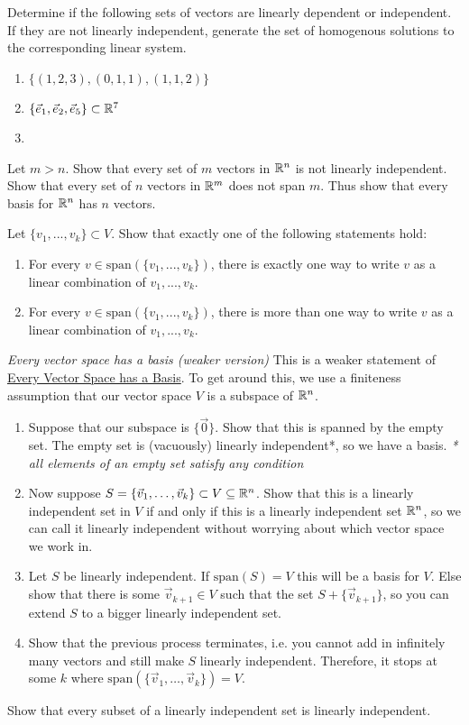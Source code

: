 \begin{exerciselist}
	\item Determine if the following sets of vectors are linearly dependent or independent. If they are not linearly independent, generate the set of homogenous solutions to the corresponding linear system. \begin{enumerate}[label=(\alph*)]
		\item $\{(1,2,3), (0,1,1),(1,1,2)\}$
		\item $\{\vec{e}_1,\vec{e}_2,\vec{e}_5\}\subset\mathbb{R}^7$
		\item 
	\end{enumerate}
	\item Let $m>n$. Show that every set of $m$ vectors in $\mathbb{R}^n$ is not linearly independent. Show that every set of $n$ vectors in $\mathbb{R}^m$ does not span $m$. Thus show that every basis for $\mathbb{R}^n$ has $n$ vectors.
	\item Let $\{v_1,...,v_k\}\subset V$. Show that exactly one of the following statements hold: \begin{enumerate}[label=(\alph*)]
		\item For every $v\in \textrm{span}(\{v_1,...,v_k\})$, there is exactly one way to write $v$ as a linear combination of $v_1,...,v_k$.
		\item For every $v\in \textrm{span}(\{v_1,...,v_k\})$, there is more than one way to write $v$ as a linear combination of $v_1,...,v_k$.
	\end{enumerate}
	\item \textit{Every vector space has a basis (weaker version)} This is a weaker statement of \hyperref[thm:2.14]{Every Vector Space has a Basis}. To get around this, we use a finiteness assumption that our vector space $V$ is a subspace of $\mathbb{R}^n$.\begin{enumerate}[label=(\alph*)]
		\item Suppose that our subspace is $\{\vec{0}\}$. Show that this is spanned by the empty set. The empty set is (vacuously) linearly independent*, so we have a basis. \textit{* all elements of an empty set satisfy any condition}
		\item Now suppose $S=\{\vec{v}_1,\ldots,\vec{v}_k\}\subset V\subseteq \mathbb{R}^n$. Show that this is a linearly independent set in $V$ if and only if this is a linearly independent set $\mathbb{R}^n$, so we can call it linearly independent without worrying about which vector space we work in.
		\item Let $S$ be linearly independent. If $\textrm{span}(S)=V$ this will be a basis for $V$. Else show that there is some $\vec{v}_{k+1}\in V$ such that the set $S+\{\vec{v}_{k+1}\}$, so you can extend $S$ to a bigger linearly independent set.
		\item Show that the previous process terminates, i.e. you cannot add in infinitely many vectors and still make $S$ linearly independent. Therefore, it stops at some $k$ where $\textrm{span}(\{\vec{v}_1,\ldots,\vec{v}_k\})=V$.
	\end{enumerate}
	\item Show that every subset of a linearly independent set is linearly independent.
	\item 
\end{exerciselist}

